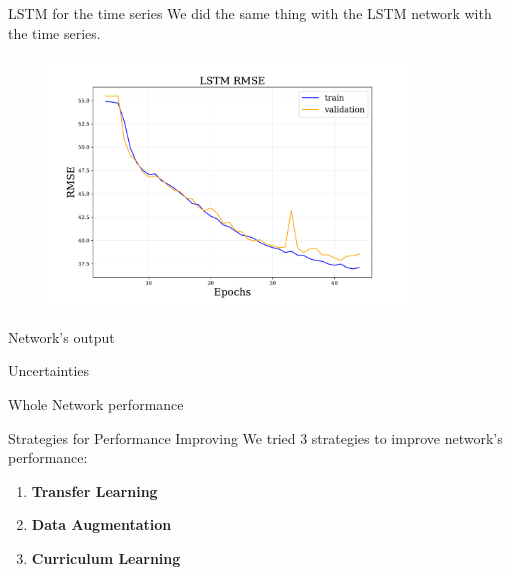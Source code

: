 \documentclass{beamer}
\begin{document}
\begin{frame}{LSTM for the time series}
    We did the same thing with the LSTM network with the time series.

    \begin{figure}
        \centering
        \includegraphics[width=0.85\textwidth]{figures/lstm_rmse.pdf}
    \end{figure}

\end{frame}


    

\begin{frame}{Network's output}

\end{frame}
\begin{frame}{Uncertainties}
    
\end{frame}

\begin{frame}{Whole Network performance}

    
\end{frame}

\begin{frame}{Strategies for Performance Improving}
    We tried 3 strategies to improve network's performance:
        \begin{enumerate}
            \item \textbf{Transfer Learning}
            \item \textbf{Data Augmentation}
            \item \textbf{Curriculum Learning}  
        \end{enumerate}

    
\end{frame}
\end{document}
